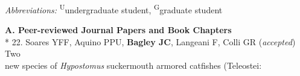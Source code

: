 \documentclass[margin,line]{res}
\begin{document}
\begin{resume}

\emph{Abbreviations:} \textsuperscript{U}undergraduate student, \textsuperscript{G}graduate student

\textbf{A. Peer-reviewed Journal Papers and Book Chapters}\vspace{2mm}\\*
%
%
22. Soares YFF, Aquino PPU, \textbf{Bagley JC}, Langeani F, Colli GR (\emph{accepted}) Two\\
\hspace*{8mm} new species of \emph{Hypostomus} suckermouth armored catfishes (Teleostei:\\
\vspace{2mm}

\end{resume}
\end{document}
